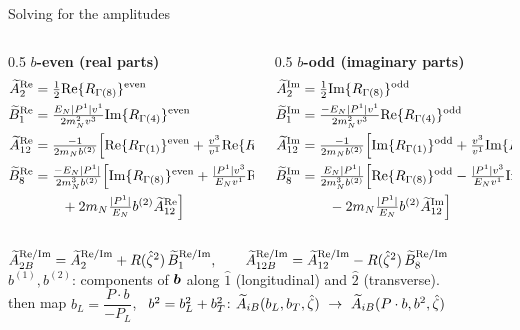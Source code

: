 \begin{frame}{Solving for the amplitudes}
  \footnotesize
  \begin{columns}[t]
    \begin{column}{0.5\textwidth}
      \textbf{$b$-even (real parts)}
      \begin{align*}
        \widetilde{A}^{\text{Re}}_2 &= \tfrac{1}{2}\text{Re}\{ R_{\Gamma(8)}\}^{\text{even}} \\
        \widetilde{B}^{\text{Re}}_1 &= \tfrac{E_{N}|P^1|v^1}{2m_N^2  v^3} \text{Im}\{ R_{\Gamma(4)}\}^{\text{even}} \\
        \widetilde{A}^{\text{Re}}_{12} &= \tfrac{-1}{2m_N  b^{(2)}}\Big[\text{Re}\{ R_{\Gamma(1)}\}^{\text{even}}+\tfrac{v^3}{v^1}\text{Re}\{ R_{\Gamma(4)}\}^{\text{even}}\Big] \\
        \widetilde{B}^{\text{Re}}_8 &= \tfrac{-E_N |P^1|}{ 2m_N^3 b^{(2)} }\Big[\text{Im}\{ R_{\Gamma(8)}\}^{\text{even}}+\tfrac{|P^1|v^3}{E_N v^1}\text{Re}\{ R_{\Gamma(4)}\}^{\text{even}} \\ &\qquad + 2m_N  \tfrac{|P^1|}{E_N} b^{(2)}  \widetilde{A}^{\text{Re}}_{12}\Big]
      \end{align*}
    \end{column}
    \begin{column}{0.5\textwidth}
      \textbf{$b$-odd (imaginary parts)}
      \begin{align*}
        \widetilde{A}^{\text{Im}}_2 &= \tfrac{1}{2}\text{Im}\{ R_{\Gamma(8)}\}^{\text{odd}} \\
        \widetilde{B}^{\text{Im}}_1 &= \tfrac{-E_{N}|P^1|v^1}{2m_N^2 v^3} \text{Re}\{ R_{\Gamma(4)}\}^{\text{odd}} \\
        \widetilde{A}^{\text{Im}}_{12} &= \tfrac{-1}{2m_N  b^{(2)}}\Big[\text{Im}\{ R_{\Gamma(1)}\}^{\text{odd}}+\tfrac{v^3}{v^1}\text{Im}\{ R_{\Gamma(4)}\}^{\text{odd}}\Big] \\
        \widetilde{B}^{\text{Im}}_8 &= \tfrac{E_N|P^1|}{ 2m_N^3 b^{(2)}  }\Big[\text{Re}\{ R_{\Gamma(8)}\}^{\text{odd}}-\tfrac{|P^1|v^3}{E_N v^1}\text{Im}\{ R_{\Gamma(4)}\}^{\text{odd}} \\ &\qquad - 2m_N  \tfrac{|P^1|}{E_N} b^{(2)}  \widetilde{A}^{\text{Im}}_{12}\Big]
      \end{align*}
    \end{column}
  \end{columns}
  \normalsize
  \begin{block}{}
    \centering
    $\widetilde{A}_{2B}^{\text{Re/Im}} = \widetilde{A}_2^{\text{Re/Im}} + R({\hat \zeta}^2)\, \widetilde{B}_1^{\text{Re/Im}}, \qquad
     \widetilde{A}_{12B}^{\text{Re/Im}} = \widetilde{A}_{12}^{\text{Re/Im}} - R({\hat \zeta}^2)\, \widetilde{B}_8^{\text{Re/Im}}$\\[1mm]
    {\scriptsize $b^{(1)}, b^{(2)}$: components of $\boldsymbol{b}$ along $\hat 1$ (longitudinal) and $\hat 2$ (transverse).}\\
    then map $b_L = \dfrac{P\cdot b}{-P_L}$, \ $b^2=b_L^2+b_T^2$: \quad $\widetilde{A}_{iB}(b_L, b_T, {\hat \zeta})\ \to\ \widetilde{A}_{iB}(P \cdot b, b^2, {\hat \zeta})$
  \end{block}
\end{frame}

